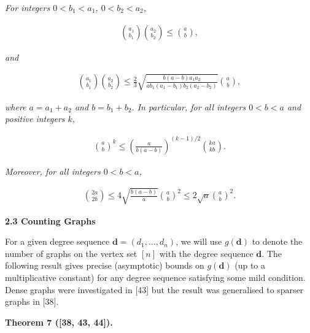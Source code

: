\emph{For integers $0<b_{1}<a_{1}$, $0<b_{2}<a_{2}$,}\par


\[\begin{gathered}
\binom{a_{1}}{b_{1}}\binom{a_{2}}{b_{2}}\leq\binom{a}{b},
\end{gathered}\]


\emph{and}\par


\[\begin{gathered}
\binom{a_{1}}{b_{1}}\binom{a_{2}}{b_{2}}\leq\frac{2}{3}\sqrt{\frac{b(a-b)a_{1}a_{2}}{ab_{1}(a_{1}-b_{1})b_{2}(a_{2}-b_{2})}}\binom{a}{b},
\end{gathered}\]


\emph{where $a=a_{1}+a_{2}$ and $b=b_{1}+b_{2}$. In particular, for all integers $0<b<a$ and positive integers $k$,}\par


\[\begin{gathered}
\binom{a}{b}^{k}\leq\left(\frac{a}{b(a-b)}\right)^{(k-1)/2}\binom{ka}{kb}.
\end{gathered}\]


\emph{Moreover, for all integers $0<b<a$,}\par


\[\begin{gathered}
\binom{2a}{2b}\leq 4\sqrt{\frac{b(a-b)}{a}}\binom{a}{b}^{2}\leq 2\sqrt{a}\binom{a}{b}^{2}.
\end{gathered}\]







\par\medskip\noindent\textbf{
2.3 Counting Graphs}\par




For a given degree sequence $\mathbf{d}=(d_{1},\ldots,d_{n})$, we will use $g(\mathbf{d})$ to denote the number of graphs on the vertex set $[n]$ with the degree sequence $\mathbf{d}$. The following result gives precise (asymptotic) bounds on $g(\mathbf{d})$ (up to a multiplicative constant) for any degree sequence satisfying some mild condition. Dense graphs were investigated in [43] but the result was generalised to sparser graphs in [38].\par





\par\medskip\noindent\textbf{
\textbf{Theorem 7}\textbf{ }([38, 43, 44])\textbf{.}
}\par



